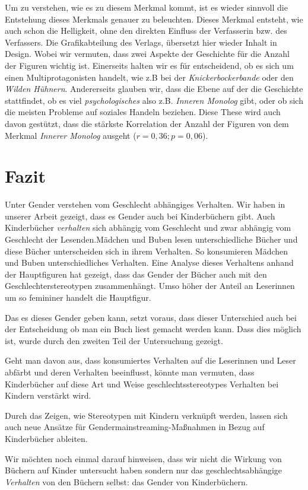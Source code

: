 Um zu verstehen, wie es zu diesem Merkmal kommt, ist es wieder sinnvoll
die Entstehung dieses Merkmals genauer zu beleuchten. Dieses Merkmal
entsteht, wie auch schon die Helligkeit, ohne den direkten Einfluss der
Verfasserin bzw. des Verfassers. Die Grafikabteilung des Verlags,
übersetzt hier wieder Inhalt in Design. Wobei wir vermuten, dass zwei
Aspekte der Geschichte für die Anzahl der Figuren wichtig ist.
Einerseits halten wir es für entscheidend, ob es sich um einen
Multiprotagonisten handelt, wie z.B bei der \emph{Knickerbockerbande}
oder den \emph{Wilden Hühnern}. Andererseits glauben wir, dass die Ebene
auf der die Geschichte stattfindet, ob es viel \emph{psychologisches}
also z.B. \emph{Inneren Monolog} gibt, oder ob sich die meisten Probleme
auf soziales Handeln beziehen. Diese These wird auch davon gestützt,
dass die stärkste Korrelation der Anzahl der Figuren von dem Merkmal
\emph{Innerer Monolog} ausgeht ($r=0{,}36; p=0{,}06$).

\chapter{Fazit}

Unter Gender verstehen  vom Geschlecht
abhängiges Verhalten. Wir haben in unserer Arbeit gezeigt, dass es
Gender auch bei Kinderbüchern gibt. Auch Kinderbücher \emph{verhalten}
sich abhängig vom Geschlecht und zwar abhängig vom Geschlecht der
Lesenden.Mädchen und Buben lesen unterschiedliche Bücher und diese
Bücher unterscheiden sich in ihrem Verhalten. So konsumieren Mädchen und
Buben unterschiedliches Verhalten. Eine Analyse dieses Verhaltens anhand
der Hauptfiguren hat gezeigt, dass das Gender der Bücher auch mit den
Geschlechterstereotypen zusammenhängt. Umso höher der Anteil an
Leserinnen um so femininer handelt die Hauptfigur.

Das es dieses Gender geben kann, setzt voraus, dass dieser Unterschied
auch bei der Entscheidung ob man ein Buch liest gemacht werden kann.
Dass dies möglich ist, wurde durch den zweiten Teil der Untersuchung
gezeigt.

Geht man davon aus, dass konsumiertes Verhalten auf die Leserinnen und
Leser abfärbt und deren Verhalten beeinflusst, könnte man vermuten, dass
Kinderbücher auf diese Art und Weise geschlechtsstereotypes Verhalten
bei Kindern verstärkt wird.

Durch das Zeigen, wie Stereotypen mit Kindern verknüpft werden, lassen
sich auch neue Ansätze für Gendermainstreaming-Maßnahmen in Bezug auf
Kinderbücher ableiten.

Wir möchten noch einmal darauf hinweisen, dass wir nicht die Wirkung von
Büchern auf Kinder untersucht haben sondern nur das geschlechtsabhängige
\emph{Verhalten} von den Büchern selbst: das Gender von Kinderbüchern.
